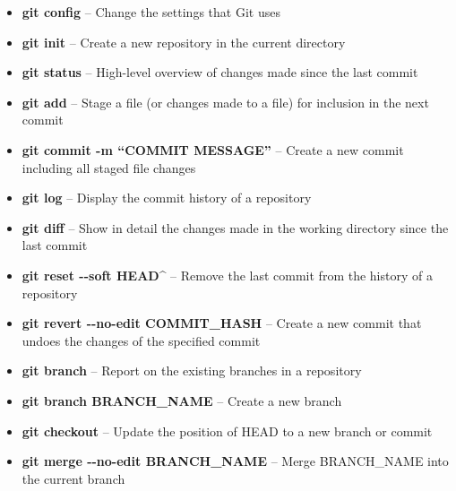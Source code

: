 \documentclass[9pt]{extarticle}
\def\itempad{-1pt}
\begin{document}
\begin{bluebox}[title=Git Command Cheat Sheet]
  \begin{itemize}
    \itemsep\itempad
  \item \textbf{git config} -- Change the settings that Git uses
  \item \textbf{git init} -- Create a new repository in the current directory
  \item \textbf{git status} -- High-level overview of changes made since the last
    commit
  \item \textbf{git add} -- Stage a file (or changes made to a file) for
    inclusion in the next commit
  \item \textbf{git commit -m ``COMMIT MESSAGE''} -- Create a new commit
    including all staged file changes
  \item \textbf{git log} -- Display the commit history of a repository
  \item \textbf{git diff} -- Show in detail the changes made in the working
    directory since the last commit
  \item \textbf{git reset -{}-soft HEAD\^} -- Remove the last commit from the
    history of a repository
  \item \textbf{git revert -{}-no-edit COMMIT\_HASH} -- Create a new commit that
    undoes the changes of the specified commit
  \item \textbf{git branch} -- Report on the existing branches in a repository
  \item \textbf{git branch BRANCH\_NAME} -- Create a new branch
  \item \textbf{git checkout} -- Update the position of HEAD to a new branch or
    commit
  \item \textbf{git merge -{}-no-edit BRANCH\_NAME} -- Merge BRANCH\_NAME into the
    current branch
  \end{itemize}
\end{bluebox}


\furtherhelp
\end{document}
